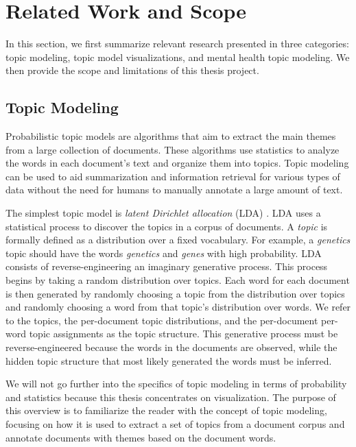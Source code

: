 \chapter{Related Work and Scope}

In this section, we first summarize relevant research presented in three categories:
topic modeling, topic model visualizations, and mental health topic modeling. We
then provide the scope and limitations of this thesis project.

\section{Topic Modeling}

Probabilistic topic models \cite{blei-topicmodel} are algorithms that aim to extract the main themes
from a large collection of documents. These algorithms use statistics to analyze the
words in each document's text and organize them into topics. Topic modeling can be
used to aid summarization and information retrieval for various types of data without
the need for humans to manually annotate a large amount of text.

The simplest topic model is \textit{latent Dirichlet allocation} (LDA) \cite{blei-topicmodel}. LDA uses a statistical process to discover the topics in a corpus of documents. A \textit{topic} is formally
defined as a distribution over a fixed vocabulary. For example, a \textit{genetics} topic
should have the words \textit{genetics} and \textit{genes} with high probability. LDA consists of
reverse-engineering an imaginary generative process. This process begins by taking a
random distribution over topics. Each word for each document is then generated by
randomly choosing a topic from the distribution over topics and randomly choosing
a word from that topic's distribution over words. We refer to the topics, the
per-document topic distributions, and the per-document per-word topic assignments as
the topic structure. This generative process must be reverse-engineered because the
words in the documents are observed, while the hidden topic structure that most
likely generated the words must be inferred.

We will not go further into the specifics of topic modeling in terms of probability
and statistics because this thesis concentrates on visualization. The purpose of this
overview is to familiarize the reader with the concept of topic modeling, focusing
on how it is used to extract a set of topics from a document corpus and annotate
documents with themes based on the document words.

